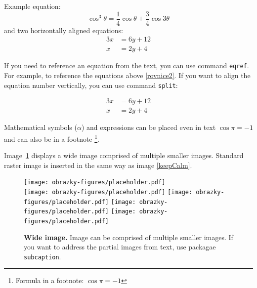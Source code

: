 
\noindent Example equation:
\begin{equation}
\cos^3 \theta =\frac{1}{4}\cos\theta+\frac{3}{4}\cos 3\theta
\label{rovnice2}
\end{equation}
and two horizontally aligned equations: %
\begin{align} \label{eq:soustava}
	3x &= 6y + 12 \\
	x &= 2y + 4 
\end{align}

If you need to reference an equation from the text, you can use command \texttt{eqref}. For example, to reference the equations above \eqref{rovnice2}. If you want to align the equation number vertically, you can use command \texttt{split}:

\begin{equation} \label{eq:soustavaSrovnana}
\begin{split}
	3x &= 6y + 12 \\
	x &= 2y + 4
\end{split}
\end{equation}

Mathematical symbols ($\alpha$) and expressions can be placed even in text $\cos\pi=-1$ and can also be in a footnote%
\footnote{Formula in a footnote: $\cos\pi=-1$}.

Image~\ref{sirokyObrazek} displays a wide image comprised of multiple smaller images. Standard raster image is inserted in the same way as image \ref{keepCalm}.

\begin{figure}[h]\centering
  \centering
  \texttt{[image: obrazky-figures/placeholder.pdf]}\\[1pt]
  \texttt{[image: obrazky-figures/placeholder.pdf]}\hfill
  \texttt{[image: obrazky-figures/placeholder.pdf]}\hfill
  \texttt{[image: obrazky-figures/placeholder.pdf]}\hfill
  \texttt{[image: obrazky-figures/placeholder.pdf]}
  \caption{\textbf{Wide image.} Image can be comprised of multiple smaller images. If you want to address the partial images from text, use packagae \texttt{subcaption}.}
  \label{sirokyObrazek}
\end{figure}

